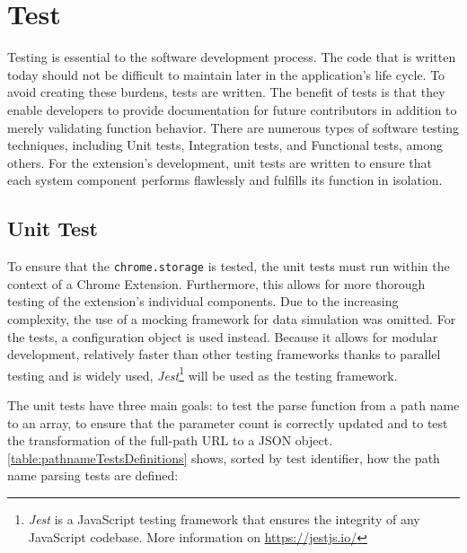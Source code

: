 \chapter{Test}
Testing is essential to the software development process. The code that is written today should not be difficult to maintain later in the application's life cycle. To avoid creating these burdens, tests are written. The benefit of tests is that they enable developers to provide documentation for future contributors in addition to merely validating function behavior. There are numerous types of software testing techniques, including Unit tests, Integration tests, and Functional tests, among others. For the extension's development, unit tests are written to ensure that each system component performs flawlessly and fulfills its function in isolation.

\section{Unit Test}
To ensure that the \texttt{chrome.storage} is tested, the unit tests must run within the context of a Chrome Extension. Furthermore, this allows for more thorough testing of the extension's individual components. Due to the increasing complexity, the use of a mocking framework for data simulation was omitted. For the tests, a configuration object is used instead. Because it allows for modular development, relatively faster than other testing frameworks thanks to parallel testing and is widely used, \emph{Jest}\footnote{\emph{Jest} is a JavaScript testing framework that ensures the integrity of any JavaScript codebase. More information on \url{https://jestjs.io/}} will be used as the testing framework.

The unit tests have three main goals: to test the parse function from a path name to an array, to ensure that the parameter count is correctly updated and to test the transformation of the full-path URL to a JSON object. \autoref{table:pathnameTestsDefinitions} shows, sorted by test identifier, how the path name parsing tests are defined:

